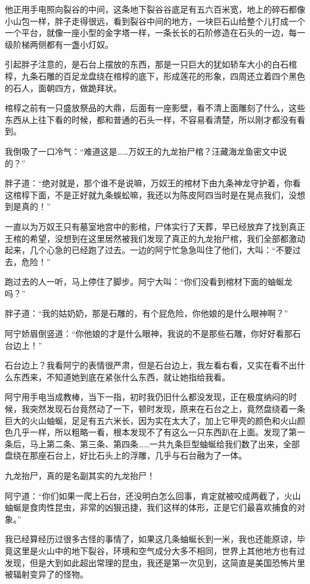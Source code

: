 他正用手电照向裂谷的中间，这条地下裂谷谷底足有五六百米宽，地上的碎石都像小山包一样，胖子走得很远，看到裂谷中间的地方，一块巨石山给整个儿打成一个一个平台，就像一座小型的金字塔一样，一条长长的石阶修造在石头的一边，每一级阶梯两侧都有一盏小灯奴。

引起胖子注意的，是石台上摆放的东西，那是一只巨大的犹如轿车大小的白石棺椁，九条石雕的百足龙盘绕在棺椁的底下，形成莲花的形象，四周还立着四个黑色的石人，面朝四方，做跪拜状。

棺椁之前有一只盛放祭品的大鼎，后面有一座影壁，看不清上面雕刻了什么，这些东西从上往下看的时候，都和普通的石头一样，不容易看清楚，所以刚才都没有看到。

我倒吸了一口冷气：“难道这是……万奴王的九龙抬尸棺？汪藏海龙鱼密文中说的？”

胖子道：“绝对就是，那个谁不是说嘛，万奴王的棺材下由九条神龙守护着，你看这棺椁下面，不是正好就九条蜈蚣嘛，我还以为陈皮阿四当时是在晃点我们，没想到是真的！”

一直以为万奴王只有墓室地宫中的影棺，尸体实行了天葬，早已经放弃了找到真正王棺的希望，没想到在这里居然被我们发现了真正的九龙抬尸棺，我们全部都激动起来，几个心急的已经跑了过去。一边的阿宁忙急急叫住了他们，大叫：“不要过去，危险！”

跑过去的人一听，马上停住了脚步。阿宁大叫：“你们没看到棺材下面的蚰蜒龙吗？”

胖子道：“我的姑奶奶，那是石雕的，有个屁危险，你他娘的是什么眼神啊？”

阿宁娇眉倒竖道：“你他娘的才是什么眼神，我说的不是那些石雕，你好好看那石台边上！”

石台边上？我看阿宁的表情很严肃，但是石台边上，我左看右看，又实在看不出什么东西来，不知道她到底在紧张什么东西，就让她指给我看。

阿宁用手电当成教棒，当下一指，初时我仍旧什么都没发现，正在极度纳闷的时候，我突然发现石台竟然动了一下，顿时发现，原来在石台之上，竟然盘绕着一条巨大的火山蚰蜒，足足有五六米长，因为实在太大了，加上它甲壳的颜色和火山颜色几乎一样，所以粗略一看，根本发现不了有这么一只东西趴在上面。发现了第一条后，马上第二条、第三条、第四条……一共九条巨型蚰蜒给我们数了出来，全部盘绕在那座石台上，好比石头上的浮雕，几乎与石台融为了一体。

九龙抬尸，真的是名副其实的九龙抬尸！

阿宁道：“你们如果一爬上石台，还没明白怎么回事，肯定就被咬成两截了，火山蚰蜒是食肉性昆虫，非常的凶狠迅捷，我们这样的体形，正是它们最喜欢捕食的对象。”

我已经算经历过很多古怪的事情了，如果这几条蚰蜒长到一米，我也还能原谅，毕竟这里是火山中的地下裂谷，环境和空气成分大多不相同，世界上其他地方也有过发现，但是大到如此超出常理的昆虫，我还是第一次见到，这简直是美国恐怖片里被辐射变异了的怪物。

